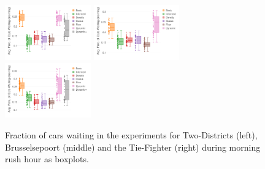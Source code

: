 \documentclass[11pt]{article}
\begin{document}
\begin{figure}[t]
	\includegraphics[width=0.33\textwidth]{img/frac_time_waiting_twodistr_bp.png}
	\includegraphics[width=0.33\textwidth]{img/frac_time_waiting_maas_bp.png}
	\includegraphics[width=0.33\textwidth]{img/frac_time_waiting_tie_bp.png}
	\caption{Fraction of cars waiting in the experiments for Two-Districts (left), Brusselsepoort (middle) and the Tie-Fighter (right) during morning rush hour as boxplots. \label{fig:frac-waits-bp}}
\end{figure}
\end{document}
